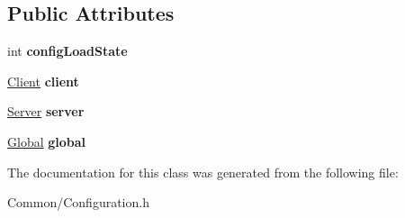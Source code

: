 \subsection*{Public Attributes}
\begin{DoxyCompactItemize}
\item 
\hypertarget{classbali_1_1_configuration_a9b80a90be4eff2f4578d57a0457970a5}{int {\bfseries config\-Load\-State}}\label{classbali_1_1_configuration_a9b80a90be4eff2f4578d57a0457970a5}

\item 
\hypertarget{classbali_1_1_configuration_a965f64fa577c33ac904db7d5bcf02cd0}{\hyperlink{structbali_1_1_configuration_1_1_client}{Client} {\bfseries client}}\label{classbali_1_1_configuration_a965f64fa577c33ac904db7d5bcf02cd0}

\item 
\hypertarget{classbali_1_1_configuration_a5916070671ddb0bf4f94c9c943cec768}{\hyperlink{structbali_1_1_configuration_1_1_server}{Server} {\bfseries server}}\label{classbali_1_1_configuration_a5916070671ddb0bf4f94c9c943cec768}

\item 
\hypertarget{classbali_1_1_configuration_a4ec89dd9d6c6b830bcc5703d866c5b81}{\hyperlink{structbali_1_1_configuration_1_1_global}{Global} {\bfseries global}}\label{classbali_1_1_configuration_a4ec89dd9d6c6b830bcc5703d866c5b81}

\end{DoxyCompactItemize}


The documentation for this class was generated from the following file\-:\begin{DoxyCompactItemize}
\item 
Common/Configuration.\-h\end{DoxyCompactItemize}
